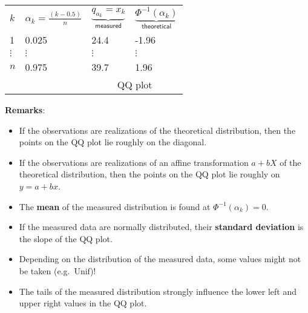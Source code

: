 \renewcommand{\arraystretch}{1.3}
\setlength{\oldtabcolsep}{\tabcolsep}\setlength\tabcolsep{12pt}
\begin{tabularx}{\linewidth}{@{}llll@{}}
    $k$      & $\alpha_k = \frac{(k-0.5)}{n}$ & $\underbrace{q_{a_k} = x_k}_{\textsf{measured}}$ & $\underbrace{\Phi^{-1}(\alpha_k)}_{\textsf{theoretical}}$ \\
    \cmidrule{2-4}
    1        & 0.025                          & 24.4                                             & -1.96                                                     \\
    $\vdots$ & $\vdots$                       & $\vdots$                                         & $\vdots$                                                  \\
    $n$      & 0.975                          & 39.7                                             & 1.96                                                      \\
    \cmidrule{3-4}
             &                                & \multicolumn{2}{c}{QQ plot}
\end{tabularx}
\renewcommand{\arraystretch}{1}
\setlength\tabcolsep{\oldtabcolsep}

\textbf{Remarks}:
\begin{itemize}
    \item If the observations are realizations of the theoretical distribution, then the points on the QQ plot lie roughly on the diagonal.
    \item If the observations are realizations of an affine transformation $a+bX$ of the theoretical distribution, then the points on the QQ plot lie roughly on $y = a+bx$.
    \item The \textbf{mean} of the measured distribution is found at $\Phi^{-1}(\alpha_k)=0$.
    \item If the measured data are normally distributed, their \textbf{standard deviation} is the slope of the QQ plot.
    \item Depending on the distribution of the measured data, some values might not be taken (e.g.\ $\mathrm{Unif}$)!
    \item The tails of the measured distribution strongly influence the lower left and upper right values in the QQ plot.
\end{itemize}